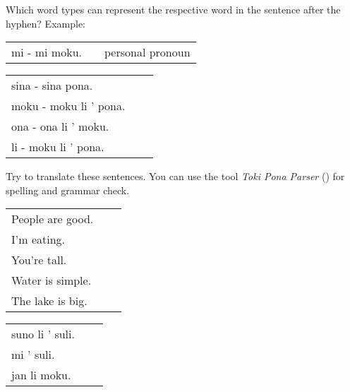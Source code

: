 Which word types can represent the respective word in the sentence after the hyphen?
Example:

\begin{supertabular}{p{5,5cm}|ll}
    mi - mi moku. &  & personal pronoun \\
\end{supertabular}

\begin{supertabular}{p{5,5cm}|ll}
    sina - sina pona.      &  & \\
    moku - moku li ' pona. &  & \\
    ona - ona li ' moku.   &  & \\
    li - moku li ' pona.   &  & \\
\end{supertabular}

Try to translate these sentences.
You can use the tool \textit{Toki Pona Parser} (\cite{www:rowa:02}) for spelling and grammar check.

\begin{supertabular}{p{5,5cm}|ll}
    People are good. &  & \\
    I'm eating.      &  & \\
    You're tall.     &  & \\
    Water is simple. &  & \\
    The lake is big. &  & \\
\end{supertabular}

\begin{supertabular}{p{5,5cm}|ll}
    suno li ' suli. &  & \\
    mi ' suli.      &  & \\
    jan li moku.    &  & \\
\end{supertabular} \\

